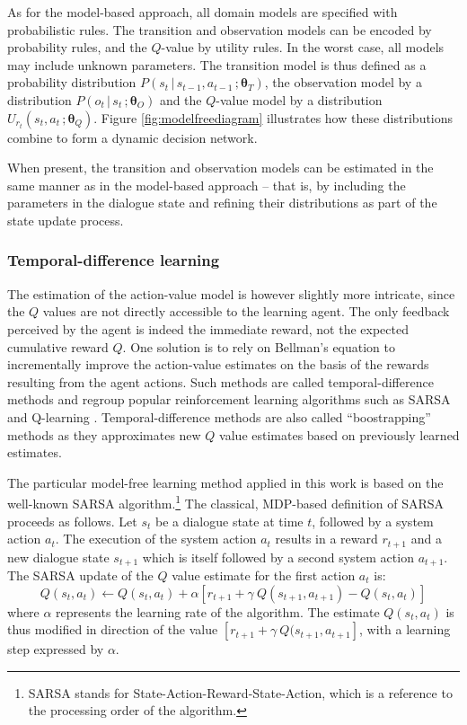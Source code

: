 As for the model-based approach, all domain models are specified with probabilistic rules. The transition and observation models can be encoded by probability rules, and the $Q$-value by utility rules. In the worst case, all models may include unknown parameters.  The transition model is thus defined as a probability distribution $P(s_t \, | \, s_{t-1}, a_{t-1} \,; \boldsymbol\theta_T)$, the observation model by a distribution $P(o_t \, | \, s_t\,; \boldsymbol\theta_O)$ and the $Q$-value model by a distribution $U_{r_t}(s_t,a_t\,; \boldsymbol\theta_Q)$.  Figure \ref{fig:modelfreediagram} illustrates how these distributions combine to form a dynamic decision network. 

When present, the transition and observation models can be estimated in the same manner as in the model-based approach -- that is, by including the parameters in the dialogue state and refining their distributions as part of the state update process. 

\subsubsection*{Temporal-difference learning}


The estimation of the action-value model is however slightly more intricate, since the $Q$ values are not directly accessible to the learning agent.  The only feedback perceived by the agent is indeed the immediate reward, not the expected cumulative reward $Q$.  One solution is to rely on Bellman's equation to incrementally improve the action-value estimates on the basis of the rewards resulting from the agent actions. Such methods are called temporal-difference methods and regroup popular reinforcement learning algorithms such as SARSA and Q-learning \citep{citeulike:112017}. Temporal-difference methods are also called ``boostrapping'' methods as they approximates new $Q$ value estimates based on previously learned estimates.

The particular model-free learning method applied in this work is based on the well-known SARSA algorithm.\footnote{SARSA stands for State-Action-Reward-State-Action, which is a reference to the processing order of the algorithm.} The classical, MDP-based definition of SARSA proceeds as follows. Let $s_t$ be a dialogue state at time $t$, followed by a system action $a_t$. The execution of the system action $a_t$ results in a reward $r_{t+1}$ and a new dialogue state $s_{t+1}$ which is itself followed by a second system action $a_{t+1}$.  The SARSA update of the $Q$ value estimate for the first action $a_t$ is:
\begin{equation}
Q(s_t, a_t) \leftarrow Q(s_t,a_t) + \alpha \left[r_{t+1} + \gamma \ Q(s_{t+1}, a_{t+1}) - Q(s_t, a_t) \right] 
\end{equation}
where $\alpha$ represents the learning rate of the algorithm. The estimate $Q(s_t, a_t)$ is thus modified in direction of the value $ \left[r_{t+1} + \gamma \ Q(s_{t+1}, a_{t+1} \right]$, with a learning step expressed by $\alpha$. 

